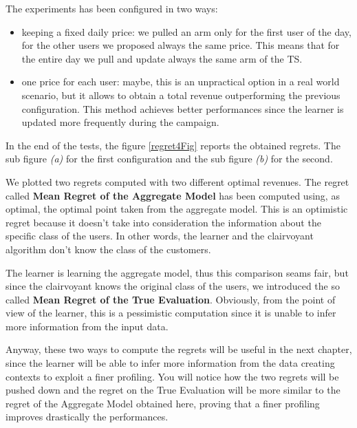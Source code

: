 The experiments has been configured in two ways:
\begin{itemize}
    \item keeping a fixed daily price: we pulled an arm only for the first user of the day, for the other users we proposed always the same price. This means that for the entire day we pull and update always the same arm of the TS.
    \item one price for each user: maybe, this is an unpractical option in a real world scenario, but it allows to obtain a total revenue outperforming the previous configuration. This method achieves better performances since the learner is updated more frequently during the campaign.
\end{itemize}

In the end of the tests, the figure \ref{regret4Fig} reports the obtained regrets. The sub figure \textit{(a)} for the first configuration and the sub figure \textit{(b)} for the second.

We plotted two regrets computed with two different optimal revenues.
The regret called \textbf{Mean Regret of the Aggregate Model} has been computed using, as optimal, the optimal point taken from the aggregate model. This is an optimistic regret because it doesn't take into consideration the information about the specific class of the users. In other words, the learner and the clairvoyant algorithm don't know the class of the customers.

The learner is learning the aggregate model, thus this comparison seams fair, but since the clairvoyant knows the original class of the users, we introduced the so called \textbf{Mean Regret of the True Evaluation}. Obviously, from the point of view of the learner, this is a pessimistic computation since it is unable to infer more information from the input data.

Anyway, these two ways to compute the regrets will be useful in the next chapter, since the learner will be able to infer more information from the data creating contexts to exploit a finer profiling.
You will notice how the two regrets will be pushed down and the regret on the True Evaluation will be more similar to the regret of the Aggregate Model obtained here, proving that a finer profiling improves drastically the performances.


